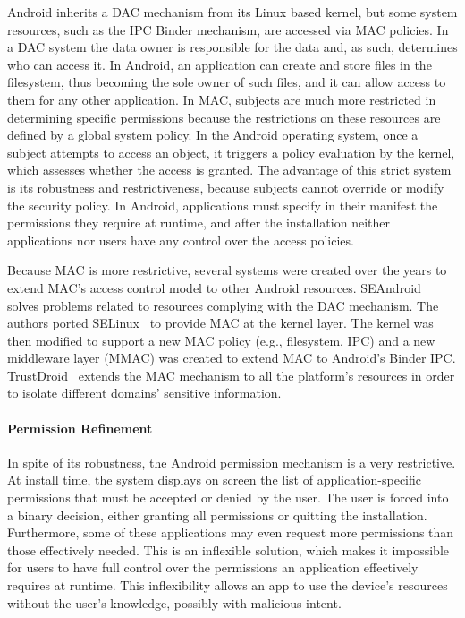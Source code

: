 Android inherits a \ac{DAC} mechanism from its Linux based kernel, but some system resources, such as the IPC Binder mechanism, are accessed via \ac{MAC} policies. In a \ac{DAC} system the data owner is responsible for the data and, as such, determines who can access it. In Android, an application can create and store files in the filesystem, thus becoming the sole owner of such files, and it can allow access to them for any other application. In \ac{MAC}, subjects are much more restricted in determining specific permissions because the restrictions on these resources are defined by a global system policy. In the Android operating system, once a subject attempts to access an object, it triggers a policy evaluation by the kernel, which assesses whether the access is granted. The advantage of this strict system is its robustness and restrictiveness, because subjects cannot override or modify the security policy. In Android, applications must specify in their manifest the permissions they require at runtime, and after the installation neither applications nor users have any control over the access policies.

Because \ac{MAC} is more restrictive, several systems were created over the years to extend \ac{MAC}'s access control model to other Android resources. SEAndroid~\cite{smalley2013security} solves problems related to resources complying with the \ac{DAC} mechanism. The authors ported SELinux~\cite{peter2001integrating} to provide \ac{MAC} at the kernel layer. The kernel was then modified to support a new \ac{MAC} policy (e.g., filesystem, IPC) and a new middleware layer (MMAC) was created to extend \ac{MAC} to Android's Binder IPC. TrustDroid~\cite{bugiel2011practical} extends the \ac{MAC} mechanism to all the platform's resources in order to isolate different domains' sensitive information.

\paragraph{\textbf{Permission Refinement}}

In spite of its robustness, the Android permission mechanism is a very restrictive. At install time, the system displays on screen the list of application-specific permissions that must be accepted or denied by the user. The user is forced into a binary decision, either granting all permissions or quitting the installation. Furthermore, some of these applications may even request more permissions than those effectively needed. This is an inflexible solution, which makes it impossible for users to have full control over the permissions an application effectively requires at runtime. This inflexibility allows an app to use the device's resources without the user's knowledge, possibly with malicious intent.

